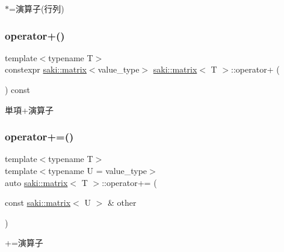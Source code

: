 $\ast$=演算子(行列) 

\mbox{\label{classsaki_1_1matrix_ada12f77277660f640f46c9bc7e67c04c}} 
\subsubsection{\texorpdfstring{operator+()}{operator+()}}
{\footnotesize\ttfamily template$<$typename T$>$ \\
constexpr \mbox{\hyperlink{classsaki_1_1matrix}{saki\+::matrix}}$<$value\+\_\+type$>$ \mbox{\hyperlink{classsaki_1_1matrix}{saki\+::matrix}}$<$ T $>$\+::operator+ (\begin{DoxyParamCaption}{ }\end{DoxyParamCaption}) const\hspace{0.3cm}{\ttfamily [inline]}}



単項+演算子 

\mbox{\label{classsaki_1_1matrix_ad004cb2830b0c22778b99b57fcbde8df}} 
\subsubsection{\texorpdfstring{operator+=()}{operator+=()}}
{\footnotesize\ttfamily template$<$typename T$>$ \\
template$<$typename U  = value\+\_\+type$>$ \\
auto \mbox{\hyperlink{classsaki_1_1matrix}{saki\+::matrix}}$<$ T $>$\+::operator+= (\begin{DoxyParamCaption}\item[{const \mbox{\hyperlink{classsaki_1_1matrix}{saki\+::matrix}}$<$ U $>$ \&}]{other }\end{DoxyParamCaption})\hspace{0.3cm}{\ttfamily [inline]}}



+=演算子 

\mbox{\label{classsaki_1_1matrix_a11aa55aa5c0efdc11c93c6a80188ac62}} 
